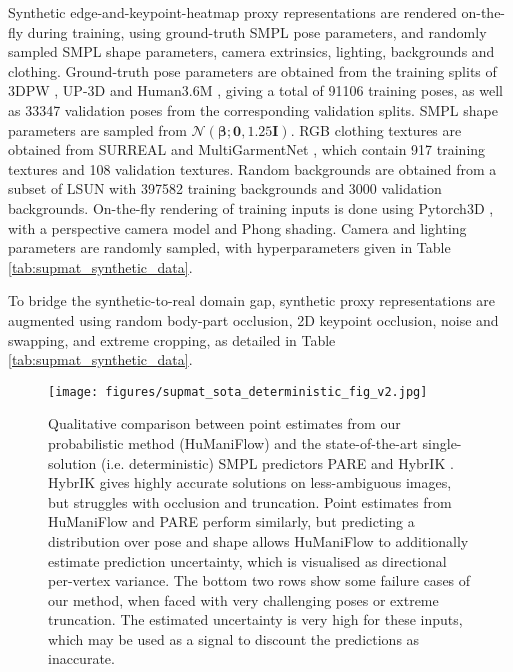 Synthetic edge-and-keypoint-heatmap proxy representations are rendered on-the-fly during training, using ground-truth SMPL \cite{SMPL:2015} pose parameters, and randomly sampled SMPL shape parameters, camera extrinsics, lighting, backgrounds and clothing. Ground-truth pose parameters are obtained from the training splits of 3DPW \cite{vonMarcard2018}, UP-3D \cite{Lassner:UP:2017} and Human3.6M \cite{h36m_pami}, giving a total of 91106 training poses, as well as 33347 validation poses from the corresponding validation splits. SMPL shape parameters are sampled from $\mathcal{N}(\boldsymbol{\beta}; \mathbf{0}, 1.25\mathbf{I})$. RGB clothing textures are obtained from SURREAL \cite{varol17_surreal} and MultiGarmentNet \cite{bhatnagar2019mgn}, which contain 917 training textures and 108 validation textures. Random backgrounds are obtained from a subset of LSUN \cite{yu15lsun} with 397582 training backgrounds and 3000 validation backgrounds. On-the-fly rendering of training inputs is done using Pytorch3D \cite{ravi2020pytorch3d}, with a perspective camera model and Phong shading. Camera and lighting parameters are randomly sampled, with hyperparameters given in Table \ref{tab:supmat_synthetic_data}.

To bridge the synthetic-to-real domain gap, synthetic proxy representations are augmented using random body-part occlusion, 2D keypoint occlusion, noise and swapping, and extreme cropping, as detailed in Table \ref{tab:supmat_synthetic_data}.

\begin{figure*}
    \centering
    \texttt{[image: figures/supmat\_sota\_deterministic\_fig\_v2.jpg]}
    \vspace{-0.1cm}
    \caption{Qualitative comparison between point estimates from our probabilistic method (HuManiFlow) and the state-of-the-art single-solution (i.e. deterministic) SMPL predictors PARE \cite{Kocabas_PARE_2021} and HybrIK \cite{li2020hybrik}. HybrIK gives highly accurate solutions on less-ambiguous images, but struggles with occlusion and truncation. Point estimates from HuManiFlow and PARE perform similarly, but predicting a distribution over pose and shape allows HuManiFlow to additionally estimate prediction uncertainty, which is visualised as directional per-vertex variance. The bottom two rows show some failure cases of our method, when faced with very challenging poses or extreme truncation. The estimated uncertainty is very high for these inputs, which may be used as a signal to discount the predictions as inaccurate.}
    \label{fig:supmat_sota_deterministic_fig}
\end{figure*}


